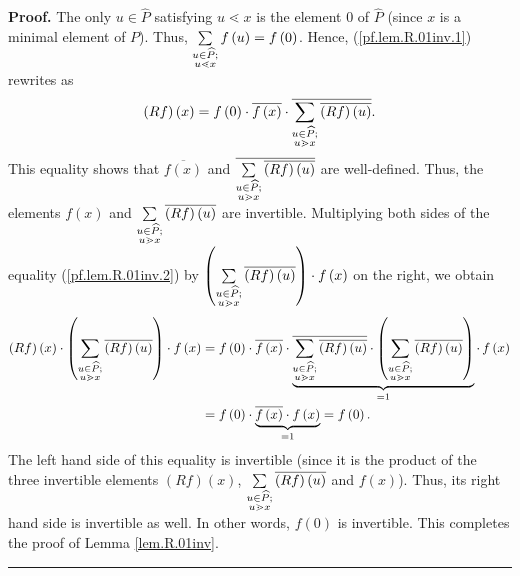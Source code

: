 \documentclass[numbers=enddot,12pt,final,onecolumn,notitlepage]{scrartcl}%
\theoremstyle{definition}
\newenvironment{verlong}{}{}
\newenvironment{proof}[1][Proof]{\noindent\textbf{#1.} }{\ \rule{0.5em}{0.5em}}
\let\sumnonlimits\sum
\renewcommand{\sum}{\sumnonlimits\limits}
\begin{document}
\begin{verlong}
\begin{proof}
The only $u\in\widehat{P}$ satisfying $u\lessdot x$ is the element $0$ of
$\widehat{P}$ (since $x$ is a minimal element of $P$). Thus, $\sum
\limits_{\substack{u\in\widehat{P};\\u\lessdot x}}f\left(  u\right)  =f\left(
0\right)  $. Hence, (\ref{pf.lem.R.01inv.1}) rewrites as%
\begin{equation}
\left(  Rf\right)  \left(  x\right)  =f\left(  0\right)  \cdot\overline
{f\left(  x\right)  }\cdot\overline{\sum\limits_{\substack{u\in\widehat{P}%
;\\u\gtrdot x}}\overline{\left(  Rf\right)  \left(  u\right)  }}.
\label{pf.lem.R.01inv.2}%
\end{equation}
This equality shows that $\overline{f\left(  x\right)  }$ and $\overline
{\sum\limits_{\substack{u\in\widehat{P};\\u\gtrdot x}}\overline{\left(
Rf\right)  \left(  u\right)  }}$ are well-defined. Thus, the elements
$f\left(  x\right)  $ and $\sum\limits_{\substack{u\in\widehat{P};\\u\gtrdot
x}}\overline{\left(  Rf\right)  \left(  u\right)  }$ are invertible.
Multiplying both sides of the equality (\ref{pf.lem.R.01inv.2}) by $\left(
\sum\limits_{\substack{u\in\widehat{P};\\u\gtrdot x}}\overline{\left(
Rf\right)  \left(  u\right)  }\right)  \cdot f\left(  x\right)  $ on the
right, we obtain%
\begin{align*}
\left(  Rf\right)  \left(  x\right)  \cdot\left(  \sum\limits_{\substack{u\in
\widehat{P};\\u\gtrdot x}}\overline{\left(  Rf\right)  \left(  u\right)
}\right)  \cdot f\left(  x\right)   &  =f\left(  0\right)  \cdot
\overline{f\left(  x\right)  }\cdot\underbrace{\overline{\sum
\limits_{\substack{u\in\widehat{P};\\u\gtrdot x}}\overline{\left(  Rf\right)
\left(  u\right)  }}\cdot\left(  \sum\limits_{\substack{u\in\widehat{P}%
;\\u\gtrdot x}}\overline{\left(  Rf\right)  \left(  u\right)  }\right)  }%
_{=1}\cdot\,f\left(  x\right) \\
&  =f\left(  0\right)  \cdot\underbrace{\overline{f\left(  x\right)  }\cdot
f\left(  x\right)  }_{=1}=f\left(  0\right)  .
\end{align*}
The left hand side of this equality is invertible (since it is the product of
the three invertible elements $\left(  Rf\right)  \left(  x\right)  $,
$\sum\limits_{\substack{u\in\widehat{P};\\u\gtrdot x}}\overline{\left(
Rf\right)  \left(  u\right)  }$ and $f\left(  x\right)  $). Thus, its right
hand side is invertible as well. In other words, $f\left(  0\right)  $ is
invertible. This completes the proof of Lemma \ref{lem.R.01inv}.
\end{proof}
\end{verlong}
\end{document}
